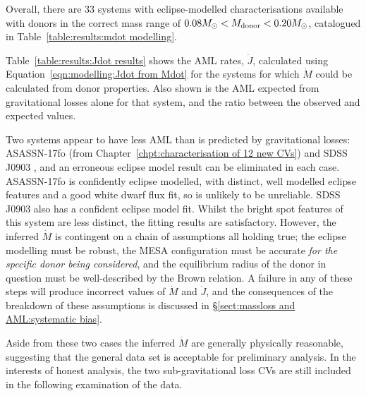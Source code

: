 Overall, there are 33 systems with eclipse-modelled characterisations available with donors in the correct mass range of $0.08 M_\odot < M_{\rm donor} < 0.20 M_\odot$, catalogued in Table~\ref{table:results:mdot modelling}.

Table~\ref{table:results:Jdot results} shows the AML rates, $\dot J$, calculated using Equation~\ref{eqn:modelling:Jdot from Mdot} for the systems for which $\dot M$ could be calculated from donor properties. Also shown is the AML expected from gravitational losses alone for that system, and the ratio between the observed and expected values.

Two systems appear to have less AML than is predicted by gravitational losses: ASASSN-17fo (from Chapter~\ref{chpt:characterisation of 12 new CVs}) and SDSS J0903 \citep{Savoury2011}, and an erroneous eclipse model result can be eliminated in each case.
ASASSN-17fo is confidently eclipse modelled, with distinct, well modelled eclipse features and a good white dwarf flux fit, so is unlikely to be unreliable. SDSS J0903 also has a confident eclipse model fit. Whilst the bright spot features of this system are less distinct, the fitting results are satisfactory.
However, the inferred $\dot M$ is contingent on a chain of assumptions all holding true; the eclipse modelling must be robust, the MESA configuration must be accurate \textit{for the specific donor being considered}, and the equilibrium radius of the donor in question must be well-described by the Brown relation. A failure in any of these steps will produce incorrect values of $\dot M$ and $\dot J$, and the consequences of the breakdown of these assumptions is discussed in \S\ref{sect:massloss and AML:systematic bias}.

Aside from these two cases the inferred $\dot M$ are generally physically reasonable, suggesting that the general data set is acceptable for preliminary analysis. In the interests of honest analysis, the two sub-gravitational loss CVs are still included in the following examination of the data.


